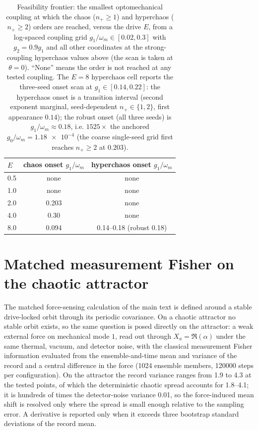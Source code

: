 \documentclass[preprint,numbers,a4paper]{elsarticle}
\begin{document}
\begin{table}[h]
  \centering
  \caption{Feasibility frontier: the smallest optomechanical coupling at which the chaos ($n_+\ge1$) and hyperchaos ($n_+\ge2$) orders are reached, versus the drive $E$, from a log-spaced coupling grid $g_1/\omega_m\in[\num{0.02},\num{0.3}]$ with $g_2=\num{0.9}g_1$ and all other coordinates at the strong-coupling hyperchaos values above (the scan is taken at $\theta=\num{0}$). ``None'' means the order is not reached at any tested coupling. The $E=\num{8}$ hyperchaos cell reports the three-seed onset scan at $g_1\in[\num{0.14},\num{0.22}]$: the hyperchaos onset is a transition interval (second exponent marginal, seed-dependent $n_+\in\{1,2\}$, first appearance $\num{0.14}$); the robust onset (all three seeds) is $g_1/\omega_m\approx\num{0.18}$, i.e. $\num{1525}\times$ the anchored $g_0/\omega_m=\num{1.18e-4}$ (the coarse single-seed grid first reaches $n_+\ge2$ at $\num{0.203}$).}
  \label{SI-tab:si-feasibility-frontier}
  \begin{tabular}{@{}lcc@{}}
    \toprule
    $E$ & chaos onset $g_1/\omega_m$ & hyperchaos onset $g_1/\omega_m$ \\
    \midrule
    \num{0.5} & none & none \\
    \num{1.0} & none & none \\
    \num{2.0} & \num{0.203} & none \\
    \num{4.0} & \num{0.30} & none \\
    \num{8.0} & \num{0.094} & \num{0.14}--\num{0.18} (robust \num{0.18}) \\
    \bottomrule
  \end{tabular}
\end{table}

\section{Matched measurement Fisher on the chaotic attractor}
\label{SI-sec:attractor-fisher}

The matched force-sensing calculation of the main text is defined around a stable drive-locked orbit through its periodic covariance. On a chaotic attractor no stable orbit exists, so the same question is posed directly on the attractor: a weak external force on mechanical mode $1$, read out through $X_a=\Re(\alpha)$ under the same thermal, vacuum, and detector noise, with the classical measurement Fisher information evaluated from the ensemble-and-time mean and variance of the record and a central difference in the force (\num{1024} ensemble members, \num{120000} steps per configuration). On the attractor the record variance ranges from \num{1.9} to \num{4.3} at the tested points, of which the deterministic chaotic spread accounts for \num{1.8}--\num{4.1}; it is hundreds of times the detector-noise variance \num{0.01}, so the force-induced mean shift is resolved only where the spread is small enough relative to the sampling error. A derivative is reported only when it exceeds three bootstrap standard deviations of the record mean.
\end{document}
